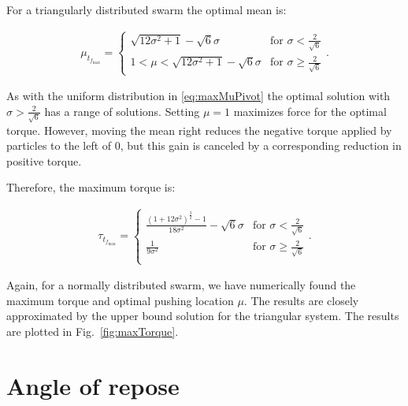 For a triangularly distributed swarm the optimal mean is:

\begin{align}
\mu_{t_{f_\max}}= \left\{
\begin{array}{ll}
 \sqrt{12\sigma^2 +1}  -\sqrt{6}\sigma &   \textrm{for     }  \sigma  <\frac{2}{\sqrt{6}} \\
1<\mu<  \sqrt{12\sigma^2 +1}  -\sqrt{6}\sigma&   \textrm{for     } \sigma \geq \frac{2}{\sqrt{6}} 
\end{array} 
\right. .
\end{align}

As with the uniform distribution in \eqref{eq:maxMuPivot} the optimal solution with $\sigma > \frac{2}{\sqrt{6}}$ has a range of solutions. Setting $\mu=1$ maximizes force for the optimal torque. However, moving the mean right reduces the negative torque applied by particles to the left of 0, but this gain is canceled by a corresponding reduction in positive torque.

Therefore, the maximum torque is:

\begin{align}\label{eq:triFreeMaxTorque}
\tau_{t_{f_\max}} =\left\{
\begin{array}{ll}
\frac{ (1+12\sigma^2)^{\frac{3}{2}}-1}{18\sigma^2} - \sqrt{6}\sigma &   \textrm{for     } \sigma < \frac{2}{\sqrt{6}}\\
\frac{1}{9\sigma^2} &   \textrm{for     } \sigma \geq \frac{2}{\sqrt{6}}\\
\end{array} 
\right. .
\end{align}

Again, for a normally distributed swarm, we have numerically found the maximum torque and optimal pushing location $\mu$. The results are closely approximated by the upper bound solution for the triangular system. 
 The results are plotted in Fig.~\ref{fig:maxTorque}.


\section{Angle of repose}\label{sec:angle}

